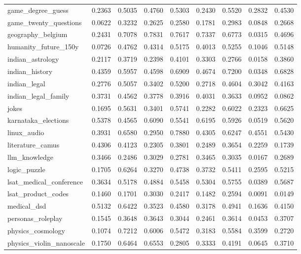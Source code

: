 \begin{landscape}
\begin{longtable}{@{}p{3.8cm}cccccccc@{}}
game\_degree\_guess & 0.2363 & 0.5035 & 0.4760 & 0.5303 & 0.2430 & 0.5520 & 0.2832 & 0.4530 \\
game\_twenty\_questions & 0.0622 & 0.3232 & 0.2625 & 0.2580 & 0.1781 & 0.2983 & 0.0848 & 0.2668 \\
geography\_belgium & 0.2431 & 0.7078 & 0.7831 & 0.7617 & 0.7337 & 0.6773 & 0.0315 & 0.4696 \\
humanity\_future\_150y & 0.0726 & 0.4762 & 0.4314 & 0.5175 & 0.4013 & 0.5255 & 0.1046 & 0.5148 \\
indian\_astrology & 0.2117 & 0.3719 & 0.2398 & 0.4101 & 0.3303 & 0.2766 & 0.0158 & 0.3860 \\
indian\_history & 0.4359 & 0.5957 & 0.4598 & 0.6909 & 0.4674 & 0.7200 & 0.0348 & 0.6828 \\
indian\_legal & 0.2776 & 0.5057 & 0.3402 & 0.5200 & 0.2718 & 0.4604 & 0.3042 & 0.4163 \\
indian\_legal\_family & 0.3731 & 0.4562 & 0.3778 & 0.3916 & 0.4031 & 0.3633 & 0.0952 & 0.0862 \\
jokes & 0.1695 & 0.5631 & 0.3401 & 0.5741 & 0.2282 & 0.6022 & 0.2323 & 0.6625 \\
karnataka\_elections & 0.5378 & 0.4565 & 0.6090 & 0.5541 & 0.6195 & 0.5926 & 0.0519 & 0.5620 \\
linux\_audio & 0.3931 & 0.6580 & 0.2950 & 0.7880 & 0.4305 & 0.6247 & 0.4551 & 0.5430 \\
literature\_camus & 0.4306 & 0.4123 & 0.2305 & 0.3801 & 0.2489 & 0.3654 & 0.2259 & 0.1739 \\
llm\_knowledge & 0.3466 & 0.2486 & 0.3029 & 0.2781 & 0.3465 & 0.3035 & 0.0167 & 0.2689 \\
logic\_puzzle & 0.1705 & 0.6264 & 0.3270 & 0.4738 & 0.3732 & 0.5411 & 0.2595 & 0.5215 \\
lsat\_medical\_conference & 0.3634 & 0.5178 & 0.4884 & 0.5458 & 0.5304 & 0.5755 & 0.0389 & 0.5687 \\
lsat\_product\_codes & 0.1460 & 0.1701 & 0.3030 & 0.2417 & 0.1482 & 0.2594 & 0.0091 & 0.0149 \\
medical\_dsd & 0.5132 & 0.6422 & 0.3523 & 0.4580 & 0.3178 & 0.4941 & 0.1636 & 0.4150 \\
personas\_roleplay & 0.1545 & 0.3648 & 0.3643 & 0.3044 & 0.2461 & 0.3614 & 0.0453 & 0.3707 \\
physics\_cosmology & 0.1074 & 0.7212 & 0.6006 & 0.5472 & 0.3183 & 0.5584 & 0.3599 & 0.2720 \\
physics\_violin\_nanoscale & 0.1750 & 0.6464 & 0.6553 & 0.2805 & 0.3333 & 0.4191 & 0.0645 & 0.3710 \\

\end{longtable}
\end{landscape}
